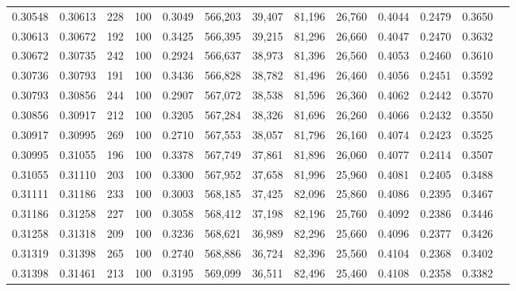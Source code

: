 \begin{tabular}{rrrrrrrrrrrrr}
0.30548 & 0.30613 &   228 & 100 &                                     0.3049 & 566,203 &  39,407 &  81,196 &  26,760 & 0.4044 & 0.2479 & 0.3650 \\
0.30613 & 0.30672 &   192 & 100 &                                     0.3425 & 566,395 &  39,215 &  81,296 &  26,660 & 0.4047 & 0.2470 & 0.3632 \\
0.30672 & 0.30735 &   242 & 100 &                                     0.2924 & 566,637 &  38,973 &  81,396 &  26,560 & 0.4053 & 0.2460 & 0.3610 \\
0.30736 & 0.30793 &   191 & 100 &                                     0.3436 & 566,828 &  38,782 &  81,496 &  26,460 & 0.4056 & 0.2451 & 0.3592 \\
0.30793 & 0.30856 &   244 & 100 &                                     0.2907 & 567,072 &  38,538 &  81,596 &  26,360 & 0.4062 & 0.2442 & 0.3570 \\
0.30856 & 0.30917 &   212 & 100 &                                     0.3205 & 567,284 &  38,326 &  81,696 &  26,260 & 0.4066 & 0.2432 & 0.3550 \\
0.30917 & 0.30995 &   269 & 100 &                                     0.2710 & 567,553 &  38,057 &  81,796 &  26,160 & 0.4074 & 0.2423 & 0.3525 \\
0.30995 & 0.31055 &   196 & 100 &                                     0.3378 & 567,749 &  37,861 &  81,896 &  26,060 & 0.4077 & 0.2414 & 0.3507 \\
0.31055 & 0.31110 &   203 & 100 &                                     0.3300 & 567,952 &  37,658 &  81,996 &  25,960 & 0.4081 & 0.2405 & 0.3488 \\
0.31111 & 0.31186 &   233 & 100 &                                     0.3003 & 568,185 &  37,425 &  82,096 &  25,860 & 0.4086 & 0.2395 & 0.3467 \\
0.31186 & 0.31258 &   227 & 100 &                                     0.3058 & 568,412 &  37,198 &  82,196 &  25,760 & 0.4092 & 0.2386 & 0.3446 \\
0.31258 & 0.31318 &   209 & 100 &                                     0.3236 & 568,621 &  36,989 &  82,296 &  25,660 & 0.4096 & 0.2377 & 0.3426 \\
0.31319 & 0.31398 &   265 & 100 &                                     0.2740 & 568,886 &  36,724 &  82,396 &  25,560 & 0.4104 & 0.2368 & 0.3402 \\
0.31398 & 0.31461 &   213 & 100 &                                     0.3195 & 569,099 &  36,511 &  82,496 &  25,460 & 0.4108 & 0.2358 & 0.3382 \\

\end{tabular}
